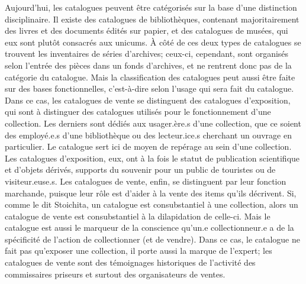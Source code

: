 Aujourd'hui, les catalogues peuvent être catégorisés sur la base d'une distinction disciplinaire. Il existe des catalogues de bibliothèques, contenant majoritairement des livres et des documents édités sur papier, et des catalogues de musées, qui eux sont plutôt consacrés aux unicums. À côté de ces deux types de catalogues se trouvent les inventaires de séries d'archives; ceux-ci, cependant, sont organisés selon l'entrée des pièces dans un fonds d'archives, et ne rentrent donc pas de la catégorie du catalogue. Mais la classification des catalogues peut aussi être faite sur des bases fonctionnelles, c'est-à-dire selon l'usage qui sera fait du catalogue. Dans ce cas, les catalogues de vente se distinguent des catalogues d'exposition, qui sont à distinguer des catalogues utilisés pour le fonctionnement d'une collection. Les derniers sont dédiés aux usager.ère.s d'une collection, que ce soient des employé.e.s d'une bibliothèque ou des lecteur.ice.s cherchant un ouvrage en particulier. Le catalogue sert ici de moyen de repérage au sein d'une collection. Les catalogues d'exposition, eux, ont à la fois le statut de publication scientifique et d'objets dérivés, supports du souvenir pour un public de touristes ou de visiteur.euse.s. Les catalogues de vente, enfin, se distinguent par leur fonction marchande, puisque leur rôle est d'aider à la vente des items qu'ils décrivent. Si, comme le dit Stoichita, un catalogue est consubstantiel à une collection, alors un catalogue de vente est consubstantiel à la dilapidation de celle-ci. Mais le catalogue est aussi le marqueur de la conscience qu'un.e collectionneur.e a de la spécificité de l'action de collectionner (et de vendre). Dans ce cas, le catalogue ne fait pas qu'exposer une collection, il porte aussi la marque de l'expert; les catalogues de vente sont des témoignages historiques de l'activité des commissaires priseurs et surtout des organisateurs de ventes.

